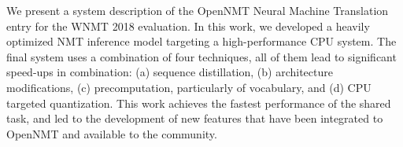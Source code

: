 We present a system description of the OpenNMT Neural Machine Translation entry for the WNMT 2018 evaluation. In this work, we developed a heavily optimized NMT inference model targeting a high-performance CPU system. The final system uses a combination of four techniques, all of them lead to significant speed-ups in combination: (a) sequence distillation, (b) architecture modifications, (c) precomputation, particularly of vocabulary, and (d) CPU targeted quantization. This work achieves the fastest performance of the shared task, and led to the development of new features that have been integrated to OpenNMT and available to the community.
